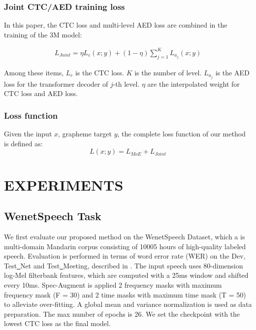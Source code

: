 \documentclass[a4paper]{article}
\begin{document}
\subsubsection{ Joint CTC/AED training loss}
In this paper, the CTC loss and multi-level AED loss are combined in the training of the 3M model:
\begin{small}
\begin{equation}
\begin{split}
L_{Joint}=\eta L_{c}(x;y)+(1-\eta)\sum_{j=1}^{K} L_{a_{j}}(x;y)
\end{split}
\end{equation}
\end{small}
Among these items, $L_{c}$ is the CTC loss. $K$ is the number of level. $L_{a_{j}}$ is the AED loss for the  transformer decoder of $j$-th level.  $\eta$ are the interpolated weight for CTC loss and AED loss.
\subsubsection{Loss function}
Given the input $x$, grapheme target $y$, the complete loss function of our method is defined as:
\begin{equation}
L(x;y)= L_{MoE}+L_{Joint}
\end{equation}

\vspace{10pt}
\section{EXPERIMENTS}
\subsection{WenetSpeech Task}
\label{sec:format}
We first evaluate our proposed method on the WenetSpeech\cite{zhang2022wenetspeech} Dataset, which a is multi-domain Mandarin corpus consisting of 10005 hours of high-quality labeled speech.
Evaluation is performed in terms of word error rate (WER) on the Dev, Test\underline{~}Net and Test\underline{~}Meeting, described in \cite{zhang2022wenetspeech}.
The input speech uses 80-dimension log-Mel filterbank features, which are computed with a 25ms window and shifted every 10ms.  Spec-Augment is applied 2 frequency masks with maximum frequency mask (F = 30) and 2 time masks with maximum time mask (T = 50) to alleviate over-fitting. A global mean and variance normalization is used as data preparation. The max number of epochs is 26. We set the checkpoint with the lowest CTC loss as the final model.
\end{document}
